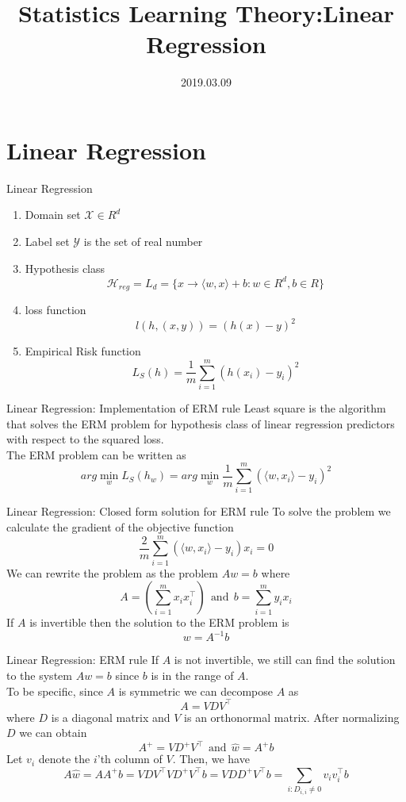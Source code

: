 \documentclass{beamer}
\title[Introduction]{Statistics Learning Theory:Linear Regression}
\author{}
\institute{}
\date{2019.03.09}
\begin{document}
\begin{frame}
  \titlepage
\end{frame}


\section{Linear Regression}
\begin{frame}{Linear Regression}
	\begin{enumerate}
		\item Domain set $\mathcal{X} \in R^d$
		\item Label set $\mathcal{Y}$ is the set of real number
		\item Hypothesis class
			\[\mathcal{H}_{reg} = L_d = \{x \rightarrow \langle w,x \rangle + b: w \in R^d, b \in R\}\]
		\item loss function
			\[l(h,(x,y)) = (h(x) - y)^2\]
		\item Empirical Risk function
			\[L_S(h) = \frac{1}{m} \sum^m_{i=1} (h(x_i) - y_i)^2\]
	\end{enumerate}
\end{frame}
\begin{frame}{Linear Regression: Implementation of ERM rule}
	Least square is the algorithm that solves the ERM problem for hypothesis class of linear regression predictors with respect to the squared loss. \\
	The ERM problem can be written as 
	\[arg \min_{w} L_S(h_w) = arg \min_w \frac{1}{m} \sum^m_{i=1} (\langle w,x_i \rangle - y_i)^2\]
\end{frame}
\begin{frame}{Linear Regression: Closed form solution for ERM rule}
	To solve the problem we calculate the gradient of the objective function
	\[\frac{2}{m} \sum^m_{i=1} (\langle w, x_i \rangle - y_i)x_i = 0\]
	We can rewrite the problem as the problem $Aw = b$ where
	\[A = (\sum^m_{i=1} x_i x^{\intercal}_i) \ \  \text{and} \ \ b=\sum^m_{i=1} y_i x_i \]
	If $A$ is invertible then the solution to the ERM problem is 
	\[w = A^{-1} b\]
\end{frame}
\begin{frame}{Linear Regression: ERM rule}
	If $A$ is not invertible, we still can find the solution to the system $Aw = b$ since $b$ is in the range of $A$.
	\\
	To be specific, since $A$ is symmetric we can decompose $A$ as 
	\[A = VDV^{\intercal}\]
	where $D$ is a diagonal matrix and $V$ is an orthonormal matrix. After normalizing $D$ we can obtain
	\[A^{+} = VD^{+}V^{\intercal} \ \ \text{and} \ \ \hat{w} = A^{+} b\]
	Let $v_i$ denote the $i$'th column of $V$. Then, we have 
\[A \hat{w} = A A^{+} b = VDV^{\intercal} VD^{+}V^{\intercal} b = VDD^{+} V^{\intercal} b = \sum_{i:D_{i,i} \neq 0} v_i v^{\intercal}_i b\]
\end{frame}
\end{document}
